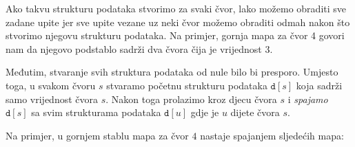 \begin{center}
\end{center}

Ako takvu strukturu podataka stvorimo za svaki čvor,
lako možemo obraditi sve zadane upite
jer sve upite vezane uz neki čvor
možemo obraditi odmah nakon što stvorimo njegovu
strukturu podataka. Na primjer, gornja
mapa za čvor 4
govori nam da njegovo podstablo
sadrži dva čvora čija je vrijednost 3.

Međutim, stvaranje svih struktura podataka
od nule bilo bi presporo.
Umjesto toga, u svakom čvoru $s$
stvaramo početnu strukturu podataka $\texttt{d}[s]$ 
koja sadrži samo vrijednost čvora $s$.
Nakon toga prolazimo kroz djecu čvora $s$ i
\emph{spajamo} $\texttt{d}[s]$ sa
svim strukturama podataka
$\texttt{d}[u]$ gdje je $u$ dijete čvora $s$.

Na primjer, u gornjem stablu mapa
za čvor $4$ nastaje spajanjem sljedećih mapa:


